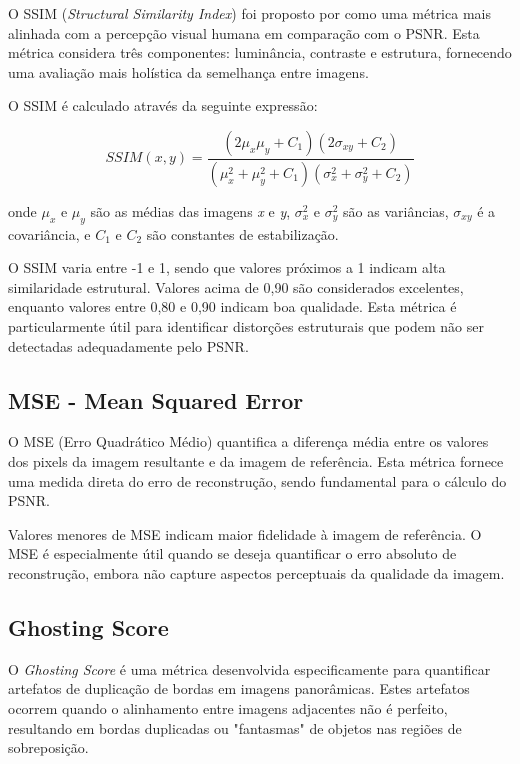 O SSIM (\textit{Structural Similarity Index}) foi proposto por \cite{wang2004image} como uma métrica mais alinhada com a percepção visual humana em comparação com o PSNR. Esta métrica considera três componentes: luminância, contraste e estrutura, fornecendo uma avaliação mais holística da semelhança entre imagens.

O SSIM é calculado através da seguinte expressão:

\begin{equation}
SSIM(x,y) = \frac{(2\mu_x\mu_y + C_1)(2\sigma_{xy} + C_2)}{(\mu_x^2 + \mu_y^2 + C_1)(\sigma_x^2 + \sigma_y^2 + C_2)}
\end{equation}

\noindent onde $\mu_x$ e $\mu_y$ são as médias das imagens \textit{x} e \textit{y}, $\sigma_x^2$ e $\sigma_y^2$ são as variâncias, $\sigma_{xy}$ é a covariância, e $C_1$ e $C_2$ são constantes de estabilização.

O SSIM varia entre -1 e 1, sendo que valores próximos a 1 indicam alta similaridade estrutural. Valores acima de 0,90 são considerados excelentes, enquanto valores entre 0,80 e 0,90 indicam boa qualidade. Esta métrica é particularmente útil para identificar distorções estruturais que podem não ser detectadas adequadamente pelo PSNR.

\subsection{MSE - Mean Squared Error}

O MSE (Erro Quadrático Médio) quantifica a diferença média entre os valores dos pixels da imagem resultante e da imagem de referência. Esta métrica fornece uma medida direta do erro de reconstrução, sendo fundamental para o cálculo do PSNR.

Valores menores de MSE indicam maior fidelidade à imagem de referência. O MSE é especialmente útil quando se deseja quantificar o erro absoluto de reconstrução, embora não capture aspectos perceptuais da qualidade da imagem.

\subsection{Ghosting Score}

O \textit{Ghosting Score} é uma métrica desenvolvida especificamente para quantificar artefatos de duplicação de bordas em imagens panorâmicas. Estes artefatos ocorrem quando o alinhamento entre imagens adjacentes não é perfeito, resultando em bordas duplicadas ou "fantasmas" de objetos nas regiões de sobreposição.

